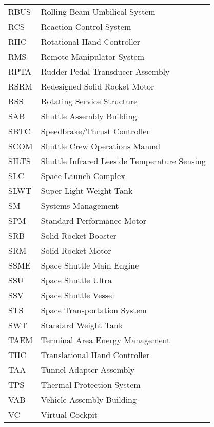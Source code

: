 \documentclass[Space_Shuttle_Vessel_Manual.tex]{subfiles}
\begin{document}
\begin{longtable}{l l }
RBUS & Rolling-Beam Umbilical System\\
RCS & Reaction Control System\\
RHC & Rotational Hand Controller\\
RMS & Remote Manipulator System\\
RPTA & Rudder Pedal Transducer Assembly\\
RSRM & Redesigned Solid Rocket Motor\\
RSS & Rotating Service Structure\\
SAB & Shuttle Assembly Building\\
SBTC & Speedbrake/Thrust Controller\\
SCOM & Shuttle Crew Operations Manual\\
SILTS & Shuttle Infrared Leeside Temperature Sensing\\
SLC & Space Launch Complex\\
SLWT & Super Light Weight Tank\\
SM & Systems Management\\
SPM & Standard Performance Motor\\
SRB & Solid Rocket Booster\\
SRM & Solid Rocket Motor\\
SSME & Space Shuttle Main Engine\\
SSU & Space Shuttle Ultra\\
SSV & Space Shuttle Vessel\\
STS & Space Transportation System\\
SWT & Standard Weight Tank\\
TAEM & Terminal Area Energy Management\\
THC & Translational Hand Controller\\
TAA & Tunnel Adapter Assembly\\
TPS & Thermal Protection System\\
VAB & Vehicle Assembly Building\\
VC & Virtual Cockpit\\
\end{longtable}
\end{document}
